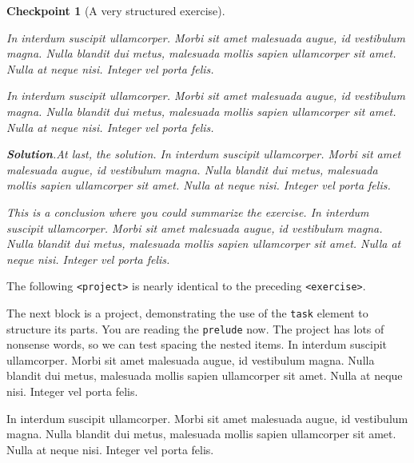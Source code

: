 \documentclass[pdflatex]{sn-jnl}
\theoremstyle{thmstyleone}%
\theoremstyle{thmstyletwo}%
\newtheorem{inlineexercise}[theorem]{Checkpoint}
\theoremstyle{thmstylethree}%
\newcommand{\blocktitlefont}{\relax}
\newcommand{\mono}[1]{\texttt{#1}}
\numberwithin{equation}{section}
\begin{document}
\begin{inlineexercise}[A very structured exercise]
\begin{enumerate}[font=\bfseries,label=(\alph*),ref=\alph*]
\par
In interdum suscipit ullamcorper. Morbi sit amet malesuada augue, id vestibulum magna. Nulla blandit dui metus, malesuada mollis sapien ullamcorper sit amet. Nulla at neque nisi. Integer vel porta felis.%
\par
In interdum suscipit ullamcorper. Morbi sit amet malesuada augue, id vestibulum magna. Nulla blandit dui metus, malesuada mollis sapien ullamcorper sit amet. Nulla at neque nisi. Integer vel porta felis.%
\par\smallskip%
\noindent\textbf{\blocktitlefont Solution}.\hypertarget{exercise-structured-6-5}{}\quad{}At last, the solution.  In interdum suscipit ullamcorper. Morbi sit amet malesuada augue, id vestibulum magna. Nulla blandit dui metus, malesuada mollis sapien ullamcorper sit amet. Nulla at neque nisi. Integer vel porta felis.%
\end{enumerate}%
This is a conclusion where you could summarize the exercise.  In interdum suscipit ullamcorper. Morbi sit amet malesuada augue, id vestibulum magna. Nulla blandit dui metus, malesuada mollis sapien ullamcorper sit amet. Nulla at neque nisi. Integer vel porta felis.%
\end{inlineexercise}%
The following \mono{<project>} is nearly identical to the preceding \mono{<exercise>}.%
\par
The next block is a project, demonstrating the use of the \mono{task} element to structure its parts.  You are reading the \mono{prelude} now.  The project has lots of nonsense words, so we can test spacing the nested items.  In interdum suscipit ullamcorper. Morbi sit amet malesuada augue, id vestibulum magna. Nulla blandit dui metus, malesuada mollis sapien ullamcorper sit amet. Nulla at neque nisi. Integer vel porta felis.%
\par
In interdum suscipit ullamcorper. Morbi sit amet malesuada augue, id vestibulum magna. Nulla blandit dui metus, malesuada mollis sapien ullamcorper sit amet. Nulla at neque nisi. Integer vel porta felis.%
\end{document}

